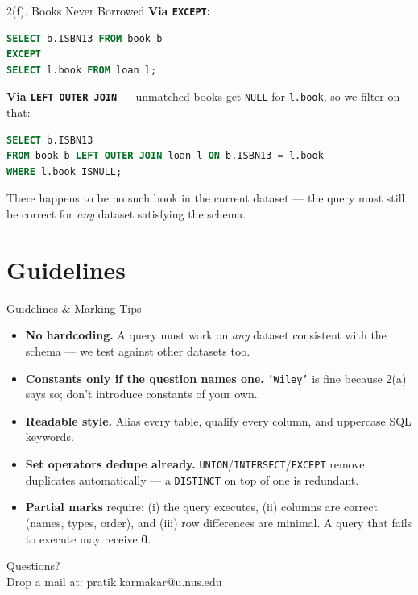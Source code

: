 \documentclass{beamer}
\begin{document}
\begin{frame}[fragile]{2(f). Books Never Borrowed}
\small
\textbf{Via \texttt{EXCEPT}:}
\begin{lstlisting}[language=SQL]
SELECT b.ISBN13 FROM book b
EXCEPT
SELECT l.book FROM loan l;
\end{lstlisting}
\textbf{Via \texttt{LEFT OUTER JOIN}} --- unmatched books get \texttt{NULL} for \texttt{l.book}, so we filter on that:
\begin{lstlisting}[language=SQL]
SELECT b.ISBN13
FROM book b LEFT OUTER JOIN loan l ON b.ISBN13 = l.book
WHERE l.book ISNULL;
\end{lstlisting}
There happens to be no such book in the current dataset --- the query must still be correct for \emph{any} dataset satisfying the schema.
\end{frame}

\section{Guidelines}

\begin{frame}{Guidelines \& Marking Tips}
\small
\begin{itemize}\itemsep4pt
  \item \textbf{No hardcoding.} A query must work on \emph{any} dataset consistent with the schema --- we test against other datasets too.
  \item \textbf{Constants only if the question names one.} \texttt{'Wiley'} is fine because 2(a) says so; don't introduce constants of your own.
  \item \textbf{Readable style.} Alias every table, qualify every column, and uppercase SQL keywords.
  \item \textbf{Set operators dedupe already.} \texttt{UNION}/\texttt{INTERSECT}/\texttt{EXCEPT} remove duplicates automatically --- a \texttt{DISTINCT} on top of one is redundant.
  \item \textbf{Partial marks} require: (i) the query executes, (ii) columns are correct (names, types, order), and (iii) row differences are minimal. A query that fails to execute may receive \textbf{0}.
\end{itemize}
\end{frame}

\begin{frame}
\begin{center}
Questions?\\
Drop a mail at: pratik.karmakar@u.nus.edu
\end{center}
\end{frame}
\end{document}
